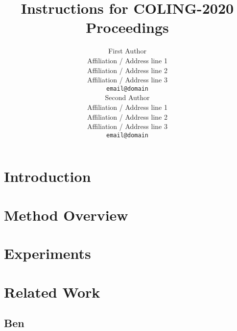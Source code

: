 \documentclass[11pt]{article}
\title{Instructions for COLING-2020 Proceedings}
\author{First Author \\
  Affiliation / Address line 1 \\
  Affiliation / Address line 2 \\
  Affiliation / Address line 3 \\
  {\tt email@domain} \\\And
  Second Author \\
  Affiliation / Address line 1 \\
  Affiliation / Address line 2 \\
  Affiliation / Address line 3 \\
  {\tt email@domain} \\}
\date{}
\begin{document}
\maketitle
\begin{abstract}
\end{abstract}

%
% 

\section{Introduction}
\label{sec:intro}

\section{Method Overview}
\label{sec:method}

\section{Experiments}
\label{sec:experiments}

\section{Related Work}
\label{sec:related}

\subsection{Ben}
\end{document}
